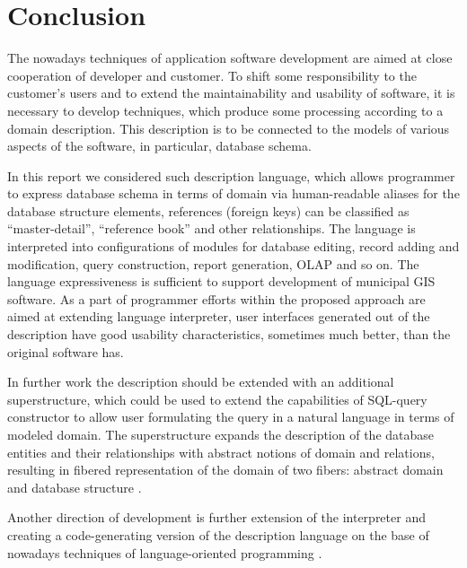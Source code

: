 \documentclass[conference]{IEEEtran}
\begin{document}


\section{Conclusion}

The nowadays techniques of application software development are aimed at close cooperation of developer and customer.  To shift some responsibility to the customer's users and to extend the maintainability and usability of software, it is necessary to develop techniques, which produce some processing according to a domain description.  This description is to be connected to the models of various aspects of the software, in particular, database schema.

In this report we considered such description language, which allows programmer to express database schema in terms of domain via human-readable aliases for the database structure elements, references (foreign keys) can be classified as ``master-detail'', ``reference book'' and other relationships.  The language is interpreted into configurations of modules for database editing, record adding and modification, query construction, report generation, OLAP and so on.  The language expressiveness is sufficient to support development of municipal GIS software.  As a part of programmer efforts within the proposed approach are aimed at extending language interpreter, user interfaces generated out of the description have good usability characteristics, sometimes much better, than the original software has.

In further work the description should be extended with an additional superstructure, which could be used to extend the capabilities of SQL-query constructor to allow user formulating the query in a natural language in terms of modeled domain.  The superstructure expands the description of the database entities and their relationships with abstract notions of domain and relations, resulting in fibered representation of the domain of two fibers: abstract domain and database structure \cite{father,b2:15}.

Another direction of development is further extension of the interpreter and creating a code-generating version of the description language on the base of nowadays techniques of language-oriented programming \cite{annenkov}.
\end{document}
